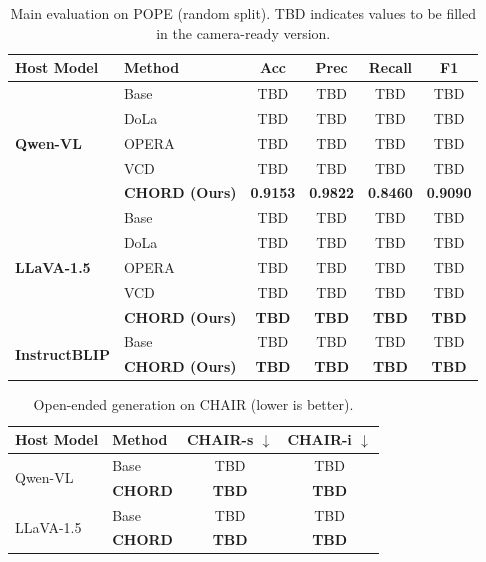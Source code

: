 \begin{table}[t]
  \centering
  \caption{Main evaluation on POPE (random split). TBD indicates values to be filled in the camera-ready version.}
  \label{tab:pope}
  \small
  \begin{tabular}{llcccc}
    \toprule
    Host Model & Method & Acc & Prec & Recall & F1 \\
    \midrule
    \multirow{5}{*}{\textbf{Qwen-VL}}
      & Base & TBD & TBD & TBD & TBD \\
      & DoLa & TBD & TBD & TBD & TBD \\
      & OPERA & TBD & TBD & TBD & TBD \\
      & VCD & TBD & TBD & TBD & TBD \\
      & \textbf{CHORD (Ours)} & \textbf{0.9153} & \textbf{0.9822} & \textbf{0.8460} & \textbf{0.9090} \\
    \midrule
    \multirow{5}{*}{\textbf{LLaVA-1.5}}
      & Base & TBD & TBD & TBD & TBD \\
      & DoLa & TBD & TBD & TBD & TBD \\
      & OPERA & TBD & TBD & TBD & TBD \\
      & VCD & TBD & TBD & TBD & TBD \\
      & \textbf{CHORD (Ours)} & \textbf{TBD} & \textbf{TBD} & \textbf{TBD} & \textbf{TBD} \\
    \midrule
    \multirow{2}{*}{\textbf{InstructBLIP}}
      & Base & TBD & TBD & TBD & TBD \\
      & \textbf{CHORD (Ours)} & \textbf{TBD} & \textbf{TBD} & \textbf{TBD} & \textbf{TBD} \\
    \bottomrule
  \end{tabular}
\end{table}

\begin{table}[t]
  \centering
  \caption{Open-ended generation on CHAIR (lower is better).}
  \label{tab:chair}
  \small
  \begin{tabular}{llcc}
    \toprule
    Host Model & Method & CHAIR-s $\downarrow$ & CHAIR-i $\downarrow$ \\
    \midrule
    \multirow{2}{*}{Qwen-VL} & Base & TBD & TBD \\
      & \textbf{CHORD} & \textbf{TBD} & \textbf{TBD} \\
    \multirow{2}{*}{LLaVA-1.5} & Base & TBD & TBD \\
      & \textbf{CHORD} & \textbf{TBD} & \textbf{TBD} \\
    \bottomrule
  \end{tabular}
\end{table}

